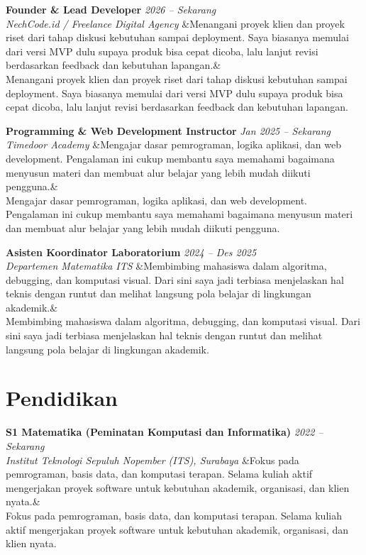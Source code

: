 \documentclass[a4paper,11pt]{article}
\newcommand{\cventry}[4]{%
  \noindent\textbf{#1} \hfill \textit{#3} \\
  \textit{#2}
  \ifx&#4& \else \\ \small #4 \fi
  \vspace{6pt}
}
\begin{document}
\cventry
  {Founder \& Lead Developer}
  {NechCode.id / Freelance Digital Agency}
  {2026 -- Sekarang}
  {Menangani proyek klien dan proyek riset dari tahap diskusi kebutuhan sampai deployment. Saya biasanya memulai dari versi MVP dulu supaya produk bisa cepat dicoba, lalu lanjut revisi berdasarkan feedback dan kebutuhan lapangan.}

\cventry
  {Programming \& Web Development Instructor}
  {Timedoor Academy}
  {Jan 2025 -- Sekarang}
  {Mengajar dasar pemrograman, logika aplikasi, dan web development. Pengalaman ini cukup membantu saya memahami bagaimana menyusun materi dan membuat alur belajar yang lebih mudah diikuti pengguna.}

\cventry
  {Asisten Koordinator Laboratorium}
  {Departemen Matematika ITS}
  {2024 -- Des 2025}
  {Membimbing mahasiswa dalam algoritma, debugging, dan komputasi visual. Dari sini saya jadi terbiasa menjelaskan hal teknis dengan runtut dan melihat langsung pola belajar di lingkungan akademik.}

\section{Pendidikan}
\cventry
  {S1 Matematika (Peminatan Komputasi dan Informatika)}
  {Institut Teknologi Sepuluh Nopember (ITS), Surabaya}
  {2022 -- Sekarang}
  {Fokus pada pemrograman, basis data, dan komputasi terapan. Selama kuliah aktif mengerjakan proyek software untuk kebutuhan akademik, organisasi, dan klien nyata.}
\end{document}
